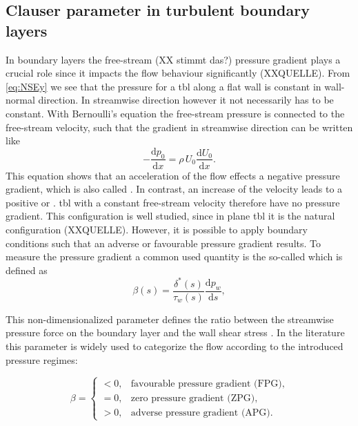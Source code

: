 \subsection{Clauser parameter in turbulent boundary layers}

In boundary layers the free-stream (XX stimmt das?) pressure gradient plays a crucial role since it impacts the flow behaviour significantly (XXQUELLE).
From \autoref{eq:NSEy} we see that the pressure for a \acrshort{tbl} along a flat wall is constant in wall-normal direction.
In streamwise direction however it not necessarily has to be constant.
With Bernoulli's equation the free-stream pressure is connected to the free-stream velocity, such that the gradient in streamwise direction can be written like
\begin{equation}\label{eq:bernoulli}
    -\frac{\mathrm{d}p_0}{\mathrm{d}x} = \rho\, U_0 \frac{\mathrm{d}U_0}{\mathrm{d}x}.
\end{equation}
This equation shows that an acceleration of the flow effects a negative pressure gradient, which is also called . 
In contrast, an increase of the velocity leads to a positive or . 
\acrshort{tbl} with a constant free-stream velocity therefore have no pressure gradient.
This  configuration is well studied, since in plane \acrshort{tbl} it is the natural configuration (XXQUELLE).
However, it is possible to apply boundary conditions such that an adverse or favourable pressure gradient results.
To measure the pressure gradient a common used quantity is the so-called  which is defined as
\begin{equation}\label{eq:beta}
    \beta(s) = \frac{\delta^*(s)}{\tau_w(s)} \frac{\mathrm{d}p_w}{\mathrm{d}s},
\end{equation}

This non-dimensionalized parameter defines the ratio between the streamwise pressure force on the boundary layer and the wall shear stress \citep{clauser_turbulent_1954}.
In the literature this parameter is widely used to categorize the flow according to the introduced pressure regimes:

\begin{equation}
    \beta =
    \begin{cases}
        < 0, & \text{favourable pressure gradient (FPG)}, \\
        = 0, & \text{zero pressure gradient (ZPG)}, \\
        > 0, & \text{adverse pressure gradient (APG)}.
    \end{cases}
\end{equation}




